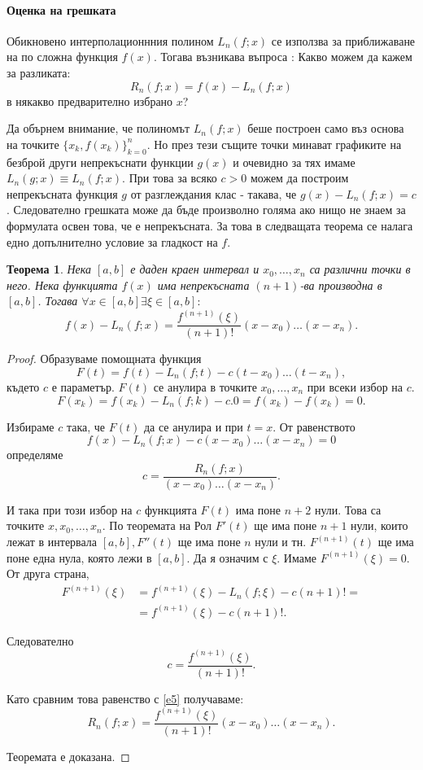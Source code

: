 \documentclass[12pt]{article}
\numberwithin{equation}{section}
\newtheorem{theorem}{Теорема}
\numberwithin{theorem}{section}
\numberwithin{definition}{section}
\numberwithin{corollary}{section}
\begin{document}
\paragraph{Оценка на грешката}
Обикновено интерполационнния полином $L_n(f;x)$ се използва за приближаване на по сложна функция $f(x)$. Тогава възникава въпроса : Какво можем да кажем за разликата:
\[
R_n(f;x) = f(x) -L_n(f;x)
\]
в някакво предварително избрано $x$?
\par
Да обърнем внимание, че полиномът $L_n(f;x)$ беше построен само въз основа на точките $\{x_k,f(x_k)\}_{k=0}^n$. Но през тези същите точки минават графиките на безброй други непрекъснати функции $g(x)$ и очевидно за тях имаме $L_n(g;x) \equiv L_n(f;x)$. При това за всяко $c > 0$ можем да построим непрекъсната функция $g$ от разглеждания клас - такава, че $g(x) - L_n(f;x) = c$. Следователно грешката може да бъде произволно голяма ако нищо не знаем за формулата освен това, че е непрекъсната. За това в следващата теорема се налага едно допълнително условие за гладкост на $f$.
\begin{theorem} \label{T2}
Нека $[a,b]$ е даден краен интервал и $x_0, \dotso, x_n$ са различни точки в него. Нека функцията $f(x)$ има непрекъсната $(n+1)$-ва производна в $[a,b]$. Тогава $\forall x \in [a,b] \exists \xi \in [a,b] :$
\[
f(x)-L_n(f;x) = \frac{f^{(n+1)}(\xi)}{(n+1)!}(x-x_0)\dotso(x-x_n).
\]
\end{theorem}
\begin{proof}
\par
Образуваме помощната функция 
\[
F(t) = f(t) - L_n(f;t) - c(t-x_0)\dotso(t-x_n),
\]
където $c$ е параметър. $F(t)$ се анулира в точките $x_0, \dotso, x_n$ при всеки избор на $c$.
\[
F(x_k) = f(x_k) - L_n(f;k) - c.0 = f(x_k) - f(x_k) = 0.
\]
\par
Избираме $c$ така, че $F(t)$ да се анулира и при $t=x$. От равенството
\[
f(x) - L_n(f;x) - c(x-x_0)\dotso(x-x_n) = 0
\]
определяме
\begin{equation}\label{e5}
c = \frac{R_n(f;x)}{(x-x_0)\dotso(x-x_n)}.
\end{equation}
\par
И така при този избор на $c$ функцията $F(t)$ има поне $n+2$ нули. Това са точките $x, x_0, \dotso, x_n$. По теоремата на Рол $F'(t)$ ще има поне $n+1$ нули, които лежат в интервала $[a,b], F''(t)$ ще има поне $n$ нули и тн. $F^{(n+1)}(t)$ ще има поне една нула, която лежи в $[a,b]$. Да я означим с $\xi$. Имаме $F^{(n+1)}(\xi) = 0$. От друга страна,
\begin{align*}
F^{(n+1)}(\xi) &= f^{(n+1)}(\xi) - L_n(f;\xi) - c(n+1)! =\\&= 
f^{(n+1)}(\xi) - c(n+1)!.
\end{align*}
\par
Следователно
\[
c = \frac{f^{(n+1)}(\xi)}{(n+1)!}.
\]
\par
Като сравним това равенство с \ref{e5} получаваме:
\[
R_n(f;x) = \frac{f^{(n+1)}(\xi)}{(n+1)!}(x-x_0)\dotso(x-x_n).
\]
\par
Теоремата е доказана.
\end{proof}
\newpage
\end{document}
